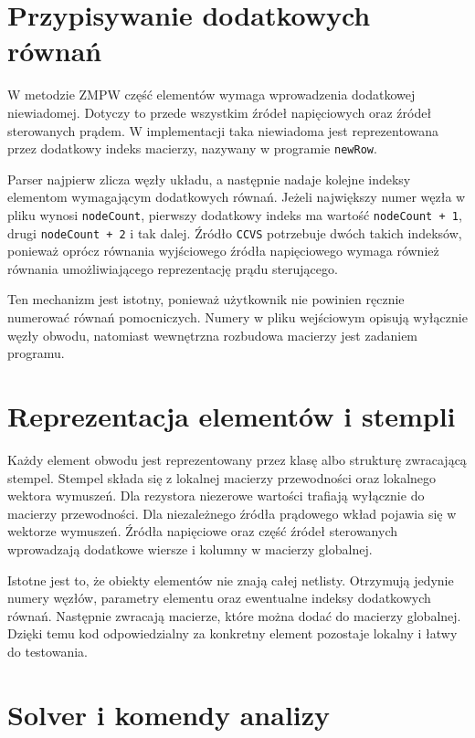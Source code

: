 \section{Przypisywanie dodatkowych równań}
\label{sec:dodatkowe-rownania-program}

W metodzie ZMPW część elementów wymaga wprowadzenia dodatkowej niewiadomej. Dotyczy to przede wszystkim źródeł napięciowych oraz źródeł sterowanych prądem. W implementacji taka niewiadoma jest reprezentowana przez dodatkowy indeks macierzy, nazywany w programie \texttt{newRow}.

Parser najpierw zlicza węzły układu, a następnie nadaje kolejne indeksy elementom wymagającym dodatkowych równań. Jeżeli największy numer węzła w pliku wynosi \texttt{nodeCount}, pierwszy dodatkowy indeks ma wartość \texttt{nodeCount + 1}, drugi \texttt{nodeCount + 2} i tak dalej. Źródło \texttt{CCVS} potrzebuje dwóch takich indeksów, ponieważ oprócz równania wyjściowego źródła napięciowego wymaga również równania umożliwiającego reprezentację prądu sterującego.

Ten mechanizm jest istotny, ponieważ użytkownik nie powinien ręcznie numerować równań pomocniczych. Numery w pliku wejściowym opisują wyłącznie węzły obwodu, natomiast wewnętrzna rozbudowa macierzy jest zadaniem programu.

\section{Reprezentacja elementów i stempli}
\label{sec:reprezentacja-elementow}

Każdy element obwodu jest reprezentowany przez klasę albo strukturę zwracającą stempel. Stempel składa się z lokalnej macierzy przewodności oraz lokalnego wektora wymuszeń. Dla rezystora niezerowe wartości trafiają wyłącznie do macierzy przewodności. Dla niezależnego źródła prądowego wkład pojawia się w wektorze wymuszeń. Źródła napięciowe oraz część źródeł sterowanych wprowadzają dodatkowe wiersze i kolumny w macierzy globalnej.

Istotne jest to, że obiekty elementów nie znają całej netlisty. Otrzymują jedynie numery węzłów, parametry elementu oraz ewentualne indeksy dodatkowych równań. Następnie zwracają macierze, które można dodać do macierzy globalnej. Dzięki temu kod odpowiedzialny za konkretny element pozostaje lokalny i łatwy do testowania.

\section{Solver i komendy analizy}
\label{sec:solver-komendy}

